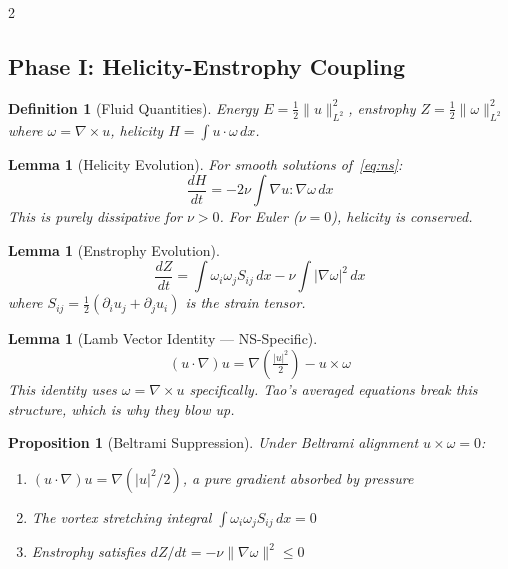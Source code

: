 \documentclass[10pt]{article}
\newtheorem{lemma}[theorem]{Lemma}
\newtheorem{proposition}[theorem]{Proposition}
\newtheorem{definition}[theorem]{Definition}
\begin{document}
\begin{multicols}{2}
\subsection{Phase I: Helicity-Enstrophy Coupling}

\begin{definition}[Fluid Quantities]
Energy $E = \tfrac{1}{2}\|u\|_{L^2}^2$, enstrophy $Z = \tfrac{1}{2}\|\omega\|_{L^2}^2$ where $\omega = \nabla \times u$, helicity $H = \int u \cdot \omega\,dx$.
\end{definition}

\begin{lemma}[Helicity Evolution]
\label{lem:helicity}
For smooth solutions of~\eqref{eq:ns}:
\begin{equation}
\frac{dH}{dt} = -2\nu \int \nabla u : \nabla \omega\,dx
\label{eq:dHdt}
\end{equation}
This is purely dissipative for $\nu > 0$. For Euler ($\nu = 0$), helicity is conserved.
\end{lemma}

\begin{lemma}[Enstrophy Evolution]
\label{lem:enstrophy}
\begin{equation}
\frac{dZ}{dt} = \int \omega_i \omega_j S_{ij}\,dx - \nu \int |\nabla \omega|^2\,dx
\label{eq:dZdt}
\end{equation}
where $S_{ij} = \tfrac{1}{2}(\partial_i u_j + \partial_j u_i)$ is the strain tensor.
\end{lemma}

\begin{lemma}[Lamb Vector Identity --- NS-Specific]
\label{lem:lamb}
\begin{equation}
(u \cdot \nabla)u = \nabla\!\left(\tfrac{|u|^2}{2}\right) - u \times \omega
\label{eq:lamb}
\end{equation}
This identity uses $\omega = \nabla \times u$ specifically. Tao's averaged equations break this structure, which is why they blow up.
\end{lemma}

\begin{proposition}[Beltrami Suppression]
\label{prop:beltrami}
Under Beltrami alignment $u \times \omega = 0$:
\begin{enumerate}[noitemsep]
\item $(u \cdot \nabla)u = \nabla(|u|^2/2)$, a pure gradient absorbed by pressure
\item The vortex stretching integral $\int \omega_i \omega_j S_{ij}\,dx = 0$
\item Enstrophy satisfies $dZ/dt = -\nu \|\nabla \omega\|^2 \leq 0$
\end{enumerate}
\end{proposition}


\end{multicols}
\end{document}
